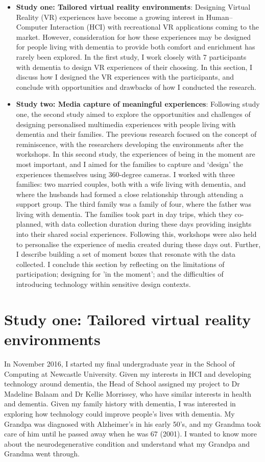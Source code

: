 \begin{itemize}
    \item  \textbf{Study one: Tailored virtual reality environments}: Designing Virtual Reality (VR) experiences have become a growing interest in Human–Computer Interaction (HCI) with recreational VR applications coming to the market. However, consideration for how these experiences may be designed for people living with dementia to provide both comfort and enrichment has rarely been explored. In the first study, I work closely with 7 participants with dementia to design VR experiences of their choosing. In this section, I discuss how I designed the VR experiences with the participants, and conclude with opportunities and drawbacks of how I conducted the research.
    
    \item \textbf{Study two: Media capture of meaningful experiences}: Following study one, the second study aimed to explore the opportunities and challenges of designing personalised multimedia experiences with people living with dementia and their families. The previous research focused on the concept of reminiscence, with the researchers developing the environments after the workshops. In this second study, the experiences of being in the moment are most important, and I aimed for the families to capture and ‘design’ the experiences themselves using 360-degree cameras. I worked with three families: two married couples, both with a wife living with dementia, and where the husbands had formed a close relationship through attending a support group. The third family was a family of four, where the father was living with dementia. The families took part in day trips, which they co-planned, with data collection duration during these days providing insights into their shared social experiences. Following this, workshops were also held to personalise the experience of media created during these days out. Further, I describe building a set of moment boxes that resonate with the data collected. I conclude this section by reflecting on the limitations of participation; designing for 'in the moment'; and the difficulties of introducing technology within sensitive design contexts.
\end{itemize}

\section{Study one: Tailored virtual reality environments}
\label{StudyOne}
In November 2016, I started my final undergraduate year in the School of Computing at Newcastle University. Given my interests in  HCI and developing technology around dementia, the Head of School assigned my project to Dr Madeline Balaam and Dr Kellie Morrissey, who have similar interests in health and dementia. Given my family history with dementia, I was interested in exploring how technology could improve people's lives with dementia. My Grandpa was diagnosed with Alzheimer’s in his early 50’s, and my Grandma took care of him until he passed away when he was 67 (2001). I wanted to know more about the neurodegenerative condition and understand what my Grandpa and Grandma went through. 

